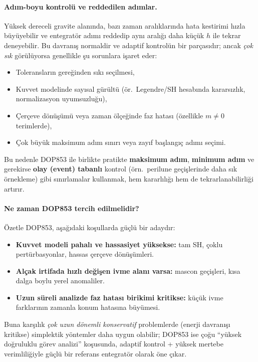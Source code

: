 \paragraph{Adım-boyu kontrolü ve reddedilen adımlar.}
Yüksek dereceli gravite alanında, bazı zaman aralıklarında hata kestirimi hızla büyüyebilir ve entegratör adımı reddedip
aynı aralığı daha küçük $h$ ile tekrar deneyebilir. Bu davranış normaldir ve adaptif kontrolün bir parçasıdır;
ancak \emph{çok sık} görülüyorsa genellikle şu sorunlara işaret eder:
\begin{itemize}
    \item Toleransların gereğinden sıkı seçilmesi,
    \item Kuvvet modelinde sayısal gürültü (ör.\ Legendre/SH hesabında kararsızlık, normalizasyon uyumsuzluğu),
    \item Çerçeve dönüşümü veya zaman ölçeğinde faz hatası (özellikle $m\neq0$ terimlerde),
    \item Çok büyük maksimum adım sınırı veya zayıf başlangıç adımı seçimi.
\end{itemize}
Bu nedenle DOP853 ile birlikte pratikte \textbf{maksimum adım}, \textbf{minimum adım} ve gerekirse
\textbf{olay (event) tabanlı} kontrol (örn.\ perilune geçişlerinde daha sık örnekleme) gibi sınırlamalar kullanmak,
hem kararlılığı hem de tekrarlanabilirliği artırır.

\paragraph{Ne zaman DOP853 tercih edilmelidir?}
Özetle DOP853, aşağıdaki koşullarda güçlü bir adaydır:
\begin{itemize}
    \item \textbf{Kuvvet modeli pahalı ve hassasiyet yüksekse:} tam SH, çoklu pertürbasyonlar, hassas çerçeve dönüşümleri.
    \item \textbf{Alçak irtifada hızlı değişen ivme alanı varsa:} mascon geçişleri, kısa dalga boylu yerel anomaliler.
    \item \textbf{Uzun süreli analizde faz hatası birikimi kritikse:} küçük ivme farklarının zamanla konum hatasına büyümesi.
\end{itemize}
Buna karşılık \emph{çok uzun dönemli konservatif} problemlerde (enerji davranışı kritikse) simplektik yöntemler daha uygun
olabilir; DOP853 ise çoğu “yüksek doğruluklu görev analizi” koşusunda, adaptif kontrol + yüksek mertebe verimliliğiyle
güçlü bir referans entegratör olarak öne çıkar.


